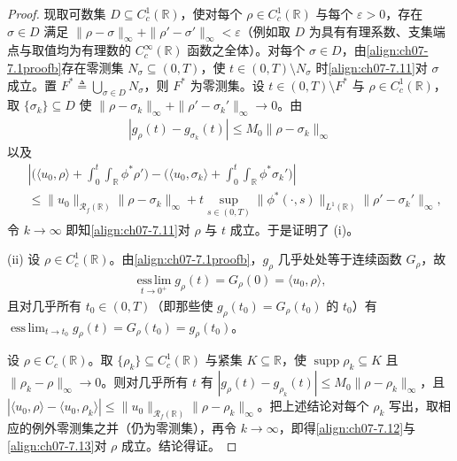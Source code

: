 ﻿\documentclass[../../main.tex]{subfiles}%
\begin{document}
\begin{proof}
现取可数集 $D\subseteq C_c^1(\mathbb{R})$，使对每个 $\rho\in C_c^1(\mathbb{R})$ 与每个 $\varepsilon>0$，存在 $\sigma\in D$ 满足 $\|\rho-\sigma\|_\infty+\|\rho'-\sigma'\|_\infty<\varepsilon$（例如取 $D$ 为具有有理系数、支集端点与取值均为有理数的 $C_c^\infty(\mathbb{R})$ 函数之全体）。对每个 $\sigma\in D$，由\eqref{align:ch07-7.1proofb}存在零测集 $N_\sigma\subseteq(0,T)$，使 $t\in(0,T)\setminus N_\sigma$ 时\eqref{align:ch07-7.11}对 $\sigma$ 成立。置 $F^*\triangleq\bigcup_{\sigma\in D}N_\sigma$，则 $F^*$ 为零测集。设 $t\in(0,T)\setminus F^*$ 与 $\rho\in C_c^1(\mathbb{R})$，取 $\{\sigma_k\}\subseteq D$ 使 $\|\rho-\sigma_k\|_\infty+\|\rho'-\sigma_k'\|_\infty\to0$。由
\begin{align*}
|g_\rho(t)-g_{\sigma_k}(t)|\leqslant M_0\|\rho-\sigma_k\|_\infty
\end{align*}
以及
\begin{align*}
&\left|\Big(\langle u_0,\rho\rangle+\int_0^t\int_{\mathbb{R}}\phi^*\rho'\Big)
-\Big(\langle u_0,\sigma_k\rangle+\int_0^t\int_{\mathbb{R}}\phi^*\sigma_k'\Big)\right|\\
&\leqslant\|u_0\|_{\mathscr{R}_f(\mathbb{R})}\|\rho-\sigma_k\|_\infty
+t\sup_{s\in(0,T)}\|\phi^*(\cdot,s)\|_{L^1(\mathbb{R})}\|\rho'-\sigma_k'\|_\infty,
\end{align*}
令 $k\to\infty$ 即知\eqref{align:ch07-7.11}对 $\rho$ 与 $t$ 成立。于是证明了 (i)。

(ii) 设 $\rho\in C_c^1(\mathbb{R})$。由\eqref{align:ch07-7.1proofb}，$g_\rho$ 几乎处处等于连续函数 $G_\rho$，故
\begin{align*}
\operatorname*{ess\,lim}_{t\to0^+}g_\rho(t)=G_\rho(0)=\langle u_0,\rho\rangle,
\end{align*}
且对几乎所有 $t_0\in(0,T)$（即那些使 $g_\rho(t_0)=G_\rho(t_0)$ 的 $t_0$）有 $\operatorname*{ess\,lim}_{t\to t_0}g_\rho(t)=G_\rho(t_0)=g_\rho(t_0)$。

设 $\rho\in C_c(\mathbb{R})$。取 $\{\rho_k\}\subseteq C_c^1(\mathbb{R})$ 与紧集 $K\subseteq\mathbb{R}$，使 $\operatorname{supp}\rho_k\subseteq K$ 且 $\|\rho_k-\rho\|_\infty\to0$。则对几乎所有 $t$ 有 $|g_\rho(t)-g_{\rho_k}(t)|\leqslant M_0\|\rho-\rho_k\|_\infty$，且 $|\langle u_0,\rho\rangle-\langle u_0,\rho_k\rangle|\leqslant\|u_0\|_{\mathscr{R}_f(\mathbb{R})}\|\rho-\rho_k\|_\infty$。把上述结论对每个 $\rho_k$ 写出，取相应的例外零测集之并（仍为零测集），再令 $k\to\infty$，即得\eqref{align:ch07-7.12}与\eqref{align:ch07-7.13}对 $\rho$ 成立。结论得证。
\end{proof}
\end{document}

